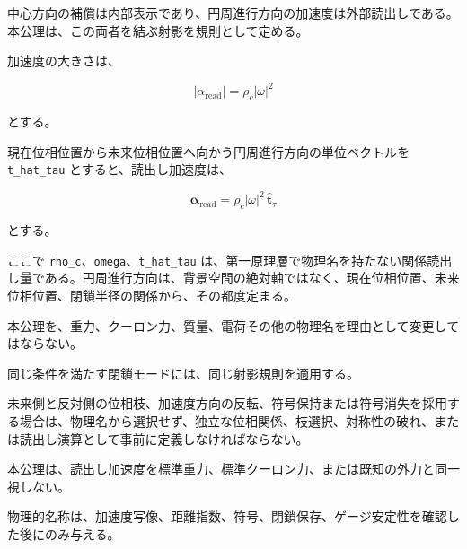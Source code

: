 \documentclass[
  a4paper,
]{ltjsarticle}
\begin{document}
中心方向の補償は内部表示であり、円周進行方向の加速度は外部読出しである。本公理は、この両者を結ぶ射影を規則として定める。

加速度の大きさは、

\[
|\alpha_{\mathrm{read}}|
=\rho_c|\omega|^2
\]

とする。

現在位相位置から未来位相位置へ向かう円周進行方向の単位ベクトルを
\texttt{t\_hat\_tau} とすると、読出し加速度は、

\[
\boldsymbol{\alpha}_{\mathrm{read}}
=\rho_c|\omega|^2\,\hat{\boldsymbol{t}}_\tau
\]

とする。

ここで \texttt{rho\_c}、\texttt{omega}、\texttt{t\_hat\_tau}
は、第一原理層で物理名を持たない関係読出し量である。円周進行方向は、背景空間の絶対軸ではなく、現在位相位置、未来位相位置、閉鎖半径の関係から、その都度定まる。

本公理を、重力、クーロン力、質量、電荷その他の物理名を理由として変更してはならない。

同じ条件を満たす閉鎖モードには、同じ射影規則を適用する。

未来側と反対側の位相枝、加速度方向の反転、符号保持または符号消失を採用する場合は、物理名から選択せず、独立な位相関係、枝選択、対称性の破れ、または読出し演算として事前に定義しなければならない。

本公理は、読出し加速度を標準重力、標準クーロン力、または既知の外力と同一視しない。

物理的名称は、加速度写像、距離指数、符号、閉鎖保存、ゲージ安定性を確認した後にのみ与える。
\end{document}
